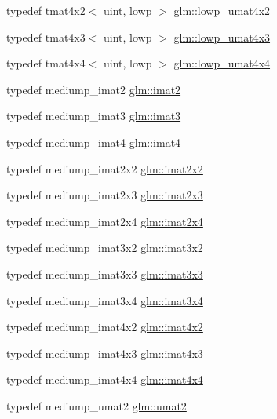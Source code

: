 \begin{DoxyCompactItemize}
\item 
typedef tmat4x2$<$ uint, lowp $>$ \hyperlink{group__gtc__matrix__integer_ga5f4e6bb892b20b532bd9caa9aee120b9}{glm\-::lowp\-\_\-umat4x2}
\item 
typedef tmat4x3$<$ uint, lowp $>$ \hyperlink{group__gtc__matrix__integer_gae94cb13770f09d0a086e6fb627f47b84}{glm\-::lowp\-\_\-umat4x3}
\item 
typedef tmat4x4$<$ uint, lowp $>$ \hyperlink{group__gtc__matrix__integer_ga6ec13ea43b4328e29219f8515c188997}{glm\-::lowp\-\_\-umat4x4}
\item 
typedef mediump\-\_\-imat2 \hyperlink{group__gtc__matrix__integer_ga77a581b3366fb63fc72f8f20830003e0}{glm\-::imat2}
\item 
typedef mediump\-\_\-imat3 \hyperlink{group__gtc__matrix__integer_ga45481922dd07a3a8e23758286311ee97}{glm\-::imat3}
\item 
typedef mediump\-\_\-imat4 \hyperlink{group__gtc__matrix__integer_ga40fc5c5e0b07543497aa1c314891544a}{glm\-::imat4}
\item 
typedef mediump\-\_\-imat2x2 \hyperlink{group__gtc__matrix__integer_gaf7f44f44d966377666d41ed059524732}{glm\-::imat2x2}
\item 
typedef mediump\-\_\-imat2x3 \hyperlink{group__gtc__matrix__integer_ga143bc5177bac9991d84b70da03952516}{glm\-::imat2x3}
\item 
typedef mediump\-\_\-imat2x4 \hyperlink{group__gtc__matrix__integer_gafe2d058e164fd1badace451ffcf4ae46}{glm\-::imat2x4}
\item 
typedef mediump\-\_\-imat3x2 \hyperlink{group__gtc__matrix__integer_ga04deef94cdfdd3b3b2706e10a32ef7f3}{glm\-::imat3x2}
\item 
typedef mediump\-\_\-imat3x3 \hyperlink{group__gtc__matrix__integer_gaeff9ef8f56cccc828d6b897923e75402}{glm\-::imat3x3}
\item 
typedef mediump\-\_\-imat3x4 \hyperlink{group__gtc__matrix__integer_gaee5507e6cbbdd05841a0c174e60dd036}{glm\-::imat3x4}
\item 
typedef mediump\-\_\-imat4x2 \hyperlink{group__gtc__matrix__integer_ga7e733984837e0e7aa9f4aac18f632f63}{glm\-::imat4x2}
\item 
typedef mediump\-\_\-imat4x3 \hyperlink{group__gtc__matrix__integer_gaa4cca8e80c0603239eda452860063844}{glm\-::imat4x3}
\item 
typedef mediump\-\_\-imat4x4 \hyperlink{group__gtc__matrix__integer_ga367d8d5281ff82f1215a227dd2ea5ba9}{glm\-::imat4x4}
\item 
typedef mediump\-\_\-umat2 \hyperlink{group__gtc__matrix__integer_gae2d45c058cfa0b60ab4df0cdda2d8516}{glm\-::umat2}

\end{DoxyCompactItemize}
